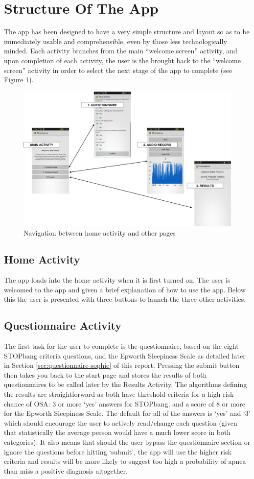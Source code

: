 \section{Structure Of The App}
The app has been designed to have a very simple structure and layout so as to be immediately usable and comprehensible, even by those less technologically minded. Each activity branches from the main “welcome screen” activity, and upon completion of each activity, the user is the brought back to the “welcome screen” activity in order to select the next stage of the app to complete (see Figure \ref{fig:appStructure}).
\begin{figure}[ht]
		\centering
			\includegraphics[width=.9\textwidth]{drawings/App_nav.png}
		\caption{Navigation between home activity and other pages}
		\label{fig:appStructure}
	\end{figure}
\subsection{Home Activity}
The app loads into the home activity when it is first turned on. The user is welcomed to the app and given a brief explanation of how to use the app. Below this the user is presented with three buttons to launch the three other activities. 
\subsection{Questionnaire Activity}
The first task for the user to complete is the questionnaire, based on the eight STOPbang criteria questions, and the Epworth Sleepiness Scale as detailed later in Section \ref{sec:questionnaire-sophie} of this report. Pressing the submit button then takes you back to the start page and stores the results of both questionnaires to be called later by the Results Activity. The algorithms defining the results are straightforward as both have threshold criteria for a high risk chance of OSA: 3 or more `yes' answers for STOPbang, and a score of 8 or more for the Epworth Sleepiness Scale. The default for all of the answers is ‘yes’ and `3' which should encourage the user to actively read/change each question (given that statistically the average person would have a much lower score in both categories). It also means that should the user bypass the questionnaire section or ignore the questions before hitting ‘submit’, the app will use the higher risk criteria and results will be more likely to suggest too high a probability of apnea than miss a positive diagnosis altogether. 
